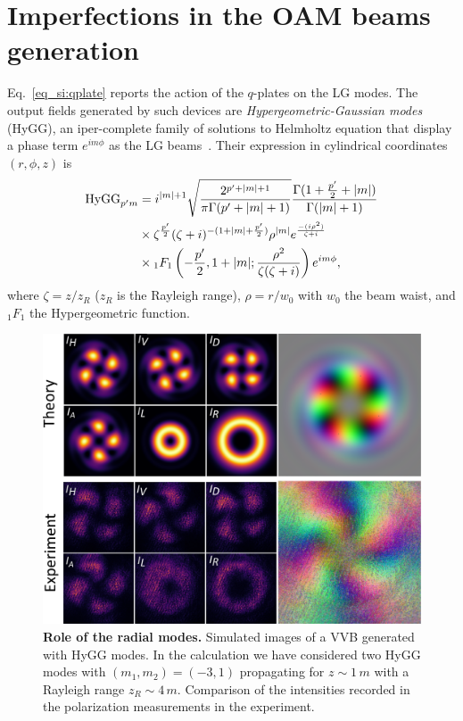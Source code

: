\documentclass[
    floatfix, aps, pra, superscriptaddress,
	10pt, twocolumn,
    nofootinbib,
	tightenlines
]{revtex4-1}
\begin{document}
\section{Imperfections in the OAM beams generation}
Eq.~\eqref{eq_si:qplate} reports the action of the $q$-plates on the LG modes. The output fields generated by such devices are  \textit{Hypergeometric-Gaussian modes} (HyGG), an iper-complete family of solutions to Helmholtz equation that display a phase term $e^{i m \phi}$ as the LG beams~\cite{Karimi:07}. Their expression in cylindrical coordinates $(r,\phi,z)$ is
\begin{align}
    \text{HyGG}_{p'm} & = i^{|m| +1} \sqrt{\frac{2^{p'+|m|+1}}{\pi \Gamma (p'+|m|+1)}}\frac{\Gamma(1+\frac{p'}{2}+|m|)}{\Gamma(|m|+1)} \notag\\
    & \times \zeta^{\frac{p'}{2}}(\zeta + i)^{-(1+|m|+\frac{p'}{2})} \rho^{|m|} e^{\frac{-(i \rho^2)}{\zeta + i}} \notag \\
    & \times {}_{1}F_1\left( -\frac{p'}{2}, 1 + |m|; \frac{\rho^2}{\zeta(\zeta+i)}\right) e^{i m \phi},
\end{align}
%
where $\zeta={z}/{z_R}$ ($z_R$ is the Rayleigh range), $\rho ={r}/{w_0}$ with $w_0$ the beam waist, and ${}_{1}F_{1}$ the Hypergeometric function.
\begin{figure}[t]
    \centering
    \includegraphics[width=\columnwidth]{supp3.pdf}
    \caption{\textbf{Role of the radial modes.} Simulated images of a VVB generated with HyGG modes. In the calculation we have considered two HyGG modes with $(m_1,m_2)=(-3,1)$ propagating for $z\sim 1\,m$ with a Rayleigh range $z_R\sim 4\,m$. Comparison of the intensities recorded in the polarization measurements in the experiment.}
    \label{fig:my_label}
\end{figure}
\end{document}
